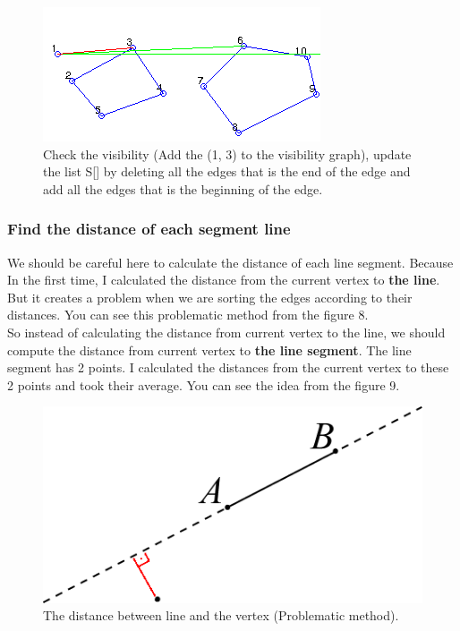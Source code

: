 \documentclass{article}
\begin{document}
\begin{figure}[!h]
\begin{center}
\includegraphics[scale=1.0]{04}
\caption{Check the visibility (Add the (1, 3) to the visibility graph), update the list S[] by deleting all the edges that is the end of the edge and add all the edges that is the beginning of the edge.}
\end{center}
\end{figure}

\subsubsection{Find the distance of each segment line}

We should be careful here to calculate the distance of each line segment. Because In the first time, I calculated the distance from the current vertex to \textbf{the line}. But it creates a problem when we are sorting the edges according to their distances. You can see this problematic method from the figure 8.
\\

So instead of calculating the distance from current vertex to the line, we should compute the distance from current vertex to \textbf{the line segment}. The line segment has 2 points. I calculated the distances from the current vertex to these 2 points and took their average. You can see the idea from the figure 9. 

\begin{figure}[!h]
\begin{center}
\includegraphics[scale=1.5]{05}
\caption{The distance between line and the vertex (Problematic method).}
\end{center}
\end{figure}
\end{document}
